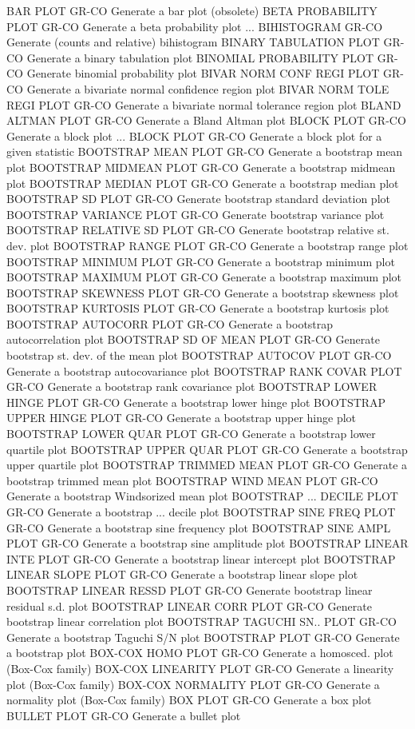 BAR PLOT                    GR-CO Generate a bar plot (obsolete)
BETA PROBABILITY PLOT       GR-CO Generate a beta probability plot
... BIHISTOGRAM             GR-CO Generate (counts and relative) bihistogram
BINARY TABULATION PLOT      GR-CO Generate a binary tabulation plot
BINOMIAL PROBABILITY PLOT   GR-CO Generate binomial probability plot
BIVAR NORM CONF REGI PLOT   GR-CO Generate a bivariate normal confidence region plot
BIVAR NORM TOLE REGI PLOT   GR-CO Generate a bivariate normal tolerance region plot
BLAND ALTMAN PLOT           GR-CO Generate a Bland Altman plot
BLOCK PLOT                  GR-CO Generate a block plot
... BLOCK PLOT              GR-CO Generate a block plot for a given statistic
BOOTSTRAP MEAN PLOT         GR-CO Generate a bootstrap mean plot
BOOTSTRAP MIDMEAN PLOT      GR-CO Generate a bootstrap midmean plot
BOOTSTRAP MEDIAN PLOT       GR-CO Generate a bootstrap median plot
BOOTSTRAP SD PLOT           GR-CO Generate bootstrap standard deviation plot
BOOTSTRAP VARIANCE PLOT     GR-CO Generate bootstrap variance plot
BOOTSTRAP RELATIVE SD PLOT  GR-CO Generate bootstrap relative st. dev. plot
BOOTSTRAP RANGE PLOT        GR-CO Generate a bootstrap range plot
BOOTSTRAP MINIMUM PLOT      GR-CO Generate a bootstrap minimum plot
BOOTSTRAP MAXIMUM PLOT      GR-CO Generate a bootstrap maximum plot
BOOTSTRAP SKEWNESS PLOT     GR-CO Generate a bootstrap skewness plot
BOOTSTRAP KURTOSIS PLOT     GR-CO Generate a bootstrap kurtosis plot
BOOTSTRAP AUTOCORR PLOT     GR-CO Generate a bootstrap autocorrelation plot
BOOTSTRAP SD OF MEAN PLOT   GR-CO Generate bootstrap st. dev. of the mean plot
BOOTSTRAP AUTOCOV PLOT      GR-CO Generate a bootstrap autocovariance plot
BOOTSTRAP RANK COVAR PLOT   GR-CO Generate a bootstrap rank covariance plot
BOOTSTRAP LOWER HINGE PLOT  GR-CO Generate a bootstrap lower hinge plot
BOOTSTRAP UPPER HINGE PLOT  GR-CO Generate a bootstrap upper hinge plot
BOOTSTRAP LOWER QUAR PLOT   GR-CO Generate a bootstrap lower quartile plot
BOOTSTRAP UPPER QUAR PLOT   GR-CO Generate a bootstrap upper quartile plot
BOOTSTRAP TRIMMED MEAN PLOT GR-CO Generate a bootstrap trimmed mean plot
BOOTSTRAP WIND MEAN PLOT    GR-CO Generate a bootstrap Windsorized mean plot
BOOTSTRAP ... DECILE PLOT   GR-CO Generate a bootstrap ... decile plot
BOOTSTRAP SINE FREQ PLOT    GR-CO Generate a bootstrap sine frequency plot
BOOTSTRAP SINE AMPL PLOT    GR-CO Generate a bootstrap sine amplitude plot
BOOTSTRAP LINEAR INTE PLOT  GR-CO Generate a bootstrap linear intercept plot
BOOTSTRAP LINEAR SLOPE PLOT GR-CO Generate a bootstrap linear slope plot
BOOTSTRAP LINEAR RESSD PLOT GR-CO Generate bootstrap linear residual s.d. plot
BOOTSTRAP LINEAR CORR PLOT  GR-CO Generate bootstrap linear correlation plot
BOOTSTRAP TAGUCHI SN.. PLOT GR-CO Generate a bootstrap Taguchi S/N plot
BOOTSTRAP PLOT              GR-CO Generate a bootstrap plot
BOX-COX HOMO PLOT           GR-CO Generate a homosced. plot (Box-Cox family)
BOX-COX LINEARITY PLOT      GR-CO Generate a linearity plot (Box-Cox family)
BOX-COX NORMALITY PLOT      GR-CO Generate a normality plot (Box-Cox family)
BOX PLOT                    GR-CO Generate a box plot
BULLET PLOT                 GR-CO Generate a bullet plot

